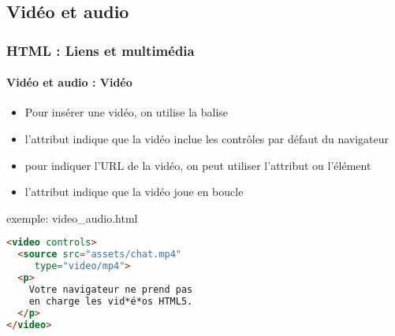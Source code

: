 \documentclass[xcolor=table]{beamer}
\begin{document}
%
%		
%


\subsection{Vidéo et audio}

\begin{frame}[fragile]
\frametitle{HTML : Liens et multimédia}
\framesubtitle{Vidéo et audio : Vidéo}

\begin{minipage}{0.50\textwidth} 
	\begin{itemize}
		\item Pour insérer une vidéo, on utilise la balise 
		\item l'attribut  indique que la vidéo inclue les contrôles par défaut du navigateur
		\item pour indiquer l'URL de la vidéo, on peut utiliser l'attribut  ou l'élément 
		\item l'attribut  indique que la vidéo  joue en boucle
	\end{itemize}
\end{minipage}
%
\begin{minipage}{0.49\textwidth}
\begin{exampleblock}{exemple: video\_audio.html}
\lstset{escapeinside=**}
\scriptsize\bfseries\vspace{-6pt}
\begin{lstlisting}[language={html}]
<video controls>
  <source src="assets/chat.mp4" 
     type="video/mp4">
  <p>
    Votre navigateur ne prend pas 
    en charge les vid*é*os HTML5.
  </p>
</video>
\end{lstlisting}\vspace{-6pt}
\end{exampleblock}
\end{minipage}

\end{frame}
\end{document}
